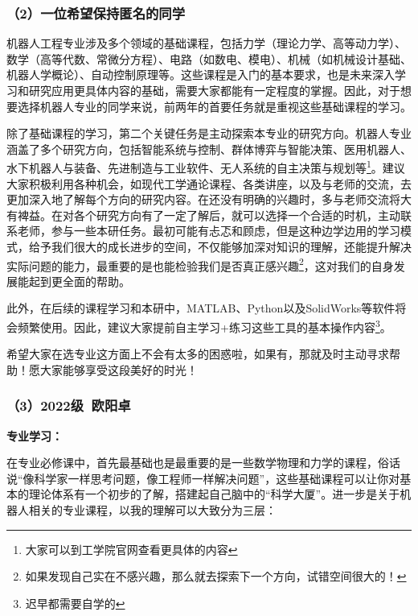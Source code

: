 \subsubsection{（2）一位希望保持匿名的同学}
机器人工程专业涉及多个领域的基础课程，包括力学（理论力学、高等动力学）、数学（高等代数、常微分方程）、电路（如数电、模电）、机械（如机械设计基础、机器人学概论）、自动控制原理等。这些课程是入门的基本要求，也是未来深入学习和研究应用更具体内容的基础，需要大家都能有一定程度的掌握。因此，对于想要选择机器人专业的同学来说，前两年的首要任务就是重视这些基础课程的学习。

\vspace{10pt}

除了基础课程的学习，第二个关键任务是主动探索本专业的研究方向。机器人专业涵盖了多个研究方向，包括智能系统与控制、群体博弈与智能决策、医用机器人、水下机器人与装备、先进制造与工业软件、无人系统的自主决策与规划等\footnote{大家可以到工学院官网查看更具体的内容}。建议大家积极利用各种机会，如现代工学通论课程、各类讲座，以及与老师的交流，去更加深入地了解每个方向的研究内容。在还没有明确的兴趣时，多与老师交流将大有裨益。在对各个研究方向有了一定了解后，就可以选择一个合适的时机，主动联系老师，参与一些本研任务。最初可能有忐忑和顾虑，但是这种边学边用的学习模式，给予我们很大的成长进步的空间，不仅能够加深对知识的理解，还能提升解决实际问题的能力，最重要的是也能检验我们是否真正感兴趣\footnote{如果发现自己实在不感兴趣，那么就去探索下一个方向，试错空间很大的！}，这对我们的自身发展能起到更全面的帮助。

\vspace{10pt}

此外，在后续的课程学习和本研中，MATLAB、Python以及SolidWorks等软件将会频繁使用。因此，建议大家提前自主学习+练习这些工具的基本操作内容\footnote{迟早都需要自学的}。

\vspace{10pt}

希望大家在选专业这方面上不会有太多的困惑啦，如果有，那就及时主动寻求帮助！愿大家能够享受这段美好的时光！

\subsubsection{（3）2022级\ 欧阳卓}
\textbf{专业学习：}

在专业必修课中，首先最基础也是最重要的是一些数学物理和力学的课程，俗话说“像科学家一样思考问题，像工程师一样解决问题”，这些基础课程可以让你对基本的理论体系有一个初步的了解，搭建起自己脑中的“科学大厦”。进一步是关于机器人相关的专业课程，以我的理解可以大致分为三层：

